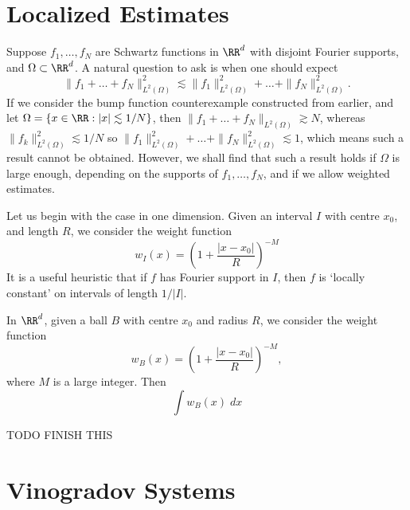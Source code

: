 \section{Localized Estimates}

Suppose $f_1, \dots, f_N$ are Schwartz functions in $\RR^d$ with disjoint Fourier supports, and $\Omega \subset \RR^d$. A natural question to ask is when one should expect
%
\[ \| f_1 + \dots + f_N \|_{L^2(\Omega)}^2 \lesssim \| f_1 \|_{L^2(\Omega)}^2 + \dots + \| f_N \|_{L^2(\Omega)}^2. \]
%
If we consider the bump function counterexample constructed from earlier, and let $\Omega = \{ x \in \RR: |x| \lesssim 1/N \}$, then $\| f_1 + \dots + f_N \|_{L^2(\Omega)} \gtrsim N$, whereas $\| f_k \|_{L^2(\Omega)}^2 \lesssim 1/N$ so $\| f_1 \|_{L^2(\Omega)}^2 + \dots + \| f_N \|_{L^2(\Omega)}^2 \lesssim 1$, which means such a result cannot be obtained. However, we shall find that such a result holds if $\Omega$ is large enough, depending on the supports of $f_1, \dots, f_N$, and if we allow weighted estimates.

Let us begin with the case in one dimension. Given an interval $I$ with centre $x_0$, and length $R$, we consider the weight function
%
\[ w_I(x) = \left( 1 + \frac{|x - x_0|}{R} \right)^{-M} \]
%
It is a useful heuristic that if $f$ has Fourier support in $I$, then $f$ is `locally constant' on intervals of length $1/|I|$.

In $\RR^d$, given a ball $B$ with centre $x_0$ and radius $R$, we consider the weight function
%
\[ w_B(x) = \left( 1 + \frac{|x - x_0|}{R} \right)^{-M}, \]
%
where $M$ is a large integer. Then
%
\[ \int w_B(x)\; dx \]

TODO FINISH THIS

\section{Vinogradov Systems}

